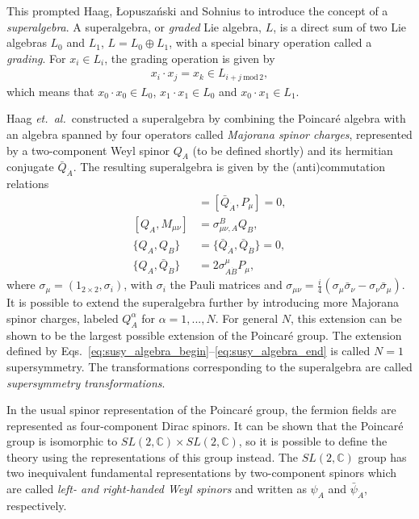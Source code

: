 \documentclass[twoside,english]{uiofysmaster}
\begin{document}
This prompted Haag, \L{}opusza\'{n}ski and Sohnius \cite{Haag1975257} to introduce the concept of a {\it superalgebra}. A superalgebra, or {\it graded} Lie algebra, $L$, is a direct sum of two Lie algebras $L_0$ and $L_1$, $L = L_0 \oplus L_1$, with a special binary operation called a {\it grading}. For $x_i \in L_i$, the grading operation is given by
\begin{align}
	x_i \cdot x_j = x_k \in L_{i+j~\mathrm{mod}\,2},
\end{align}
which means that $x_0 \cdot x_0 \in L_0$, $x_1 \cdot x_1 \in L_0$ and $x_0 \cdot x_1 \in L_1$. 

Haag {\it et.\ al.}\ constructed a superalgebra by combining the Poincar\'{e} algebra with an algebra spanned by four operators called {\it Majorana spinor charges}, represented by a two-component Weyl spinor $Q_A$ (to be defined shortly) and its hermitian conjugate $\bar Q_{\dot A}$. The resulting superalgebra is given by the (anti)commutation relations
\begin{align}
	[Q_A,P_\mu] &= [\bar Q_{\dot A}, P_\mu] = 0,\label{eq:susy_algebra_begin}\\
	[Q_A, M_{\mu\nu}] &= \sigma_{\mu\nu,A}^B Q_B,\\
	\{Q_A, Q_B\} &= \{\bar Q_{\dot A}, \bar Q_{\dot B} \} = 0,\\
	\{Q_A, \bar Q_{\dot B} \} &= 2\sigma^\mu_{A \dot B} P_\mu,\label{eq:susy_algebra_end}
\end{align}
where $\sigma_\mu = (1_{2\times2},\sigma_i)$, with $\sigma_i$ the Pauli matrices and $\sigma_{\mu\nu} = \frac{i}{4}(\sigma_\mu \bar\sigma_\nu - \sigma_\nu \bar\sigma_\mu)$. It is possible to extend the superalgebra further by introducing more Majorana spinor charges, labeled $Q_A^\alpha$ for $\alpha=1,...,N$. For general $N$, this extension can be shown to be the largest possible extension of the Poincar\'{e} group. The extension defined by Eqs.\ \eqref{eq:susy_algebra_begin}--\eqref{eq:susy_algebra_end} is called $N=1$ supersymmetry. The transformations corresponding to the superalgebra are called {\it supersymmetry transformations}.

In the usual spinor representation of the Poincar\'{e} group, the fermion fields are represented as four-component Dirac spinors. It can be shown that the Poincar\'{e} group is isomorphic to $SL(2,\mathbb{C})\times SL(2,\mathbb{C})$, so it is possible to define the theory using the representations of this group instead. The $SL(2,\mathbb{C})$ group has two inequivalent fundamental representations by two-component spinors which are called {\it left- and right-handed Weyl spinors} and written as $\psi_A$ and $\bar\psi_{\dot A}$, respectively. 
\end{document}
